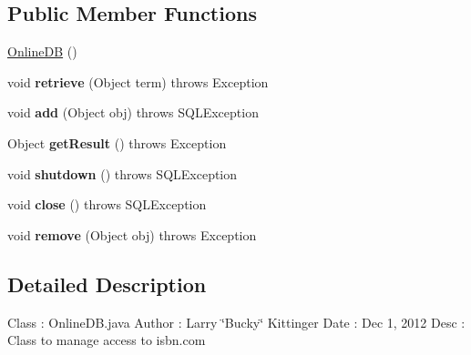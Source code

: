 \subsection*{Public Member Functions}
\begin{DoxyCompactItemize}
\item 
\hyperlink{classw3se_1_1_model_1_1_database_1_1_online_d_b_a370c67ce27af8631470af1518dfdf568}{Online\-D\-B} ()
\item 
\hypertarget{classw3se_1_1_model_1_1_database_1_1_online_d_b_a3e319374872a546c7f91506d49ee910c}{void {\bfseries retrieve} (Object term)  throws Exception 	}\label{classw3se_1_1_model_1_1_database_1_1_online_d_b_a3e319374872a546c7f91506d49ee910c}

\item 
\hypertarget{classw3se_1_1_model_1_1_database_1_1_online_d_b_ac7710110720377d0c3f4df4229f14b5d}{void {\bfseries add} (Object obj)  throws S\-Q\-L\-Exception 	}\label{classw3se_1_1_model_1_1_database_1_1_online_d_b_ac7710110720377d0c3f4df4229f14b5d}

\item 
\hypertarget{classw3se_1_1_model_1_1_database_1_1_online_d_b_a62765d8f0076e22b15be39067f1ff41d}{Object {\bfseries get\-Result} ()  throws Exception 	}\label{classw3se_1_1_model_1_1_database_1_1_online_d_b_a62765d8f0076e22b15be39067f1ff41d}

\item 
\hypertarget{classw3se_1_1_model_1_1_database_1_1_online_d_b_ad6be796bc5a7797a2dc2f5afa1133891}{void {\bfseries shutdown} ()  throws S\-Q\-L\-Exception 	}\label{classw3se_1_1_model_1_1_database_1_1_online_d_b_ad6be796bc5a7797a2dc2f5afa1133891}

\item 
\hypertarget{classw3se_1_1_model_1_1_database_1_1_online_d_b_a02892df1766806859a338fd5ed234101}{void {\bfseries close} ()  throws S\-Q\-L\-Exception 	}\label{classw3se_1_1_model_1_1_database_1_1_online_d_b_a02892df1766806859a338fd5ed234101}

\item 
\hypertarget{classw3se_1_1_model_1_1_database_1_1_online_d_b_a0d138c83c079ba84770dde7a81adc540}{void {\bfseries remove} (Object obj)  throws Exception 	}\label{classw3se_1_1_model_1_1_database_1_1_online_d_b_a0d138c83c079ba84770dde7a81adc540}

\end{DoxyCompactItemize}


\subsection{Detailed Description}
Class \-: Online\-D\-B.\-java Author \-: Larry \char`\"{}\-Bucky\char`\"{} Kittinger Date \-: Dec 1, 2012 Desc \-: Class to manage access to isbn.\-com 

